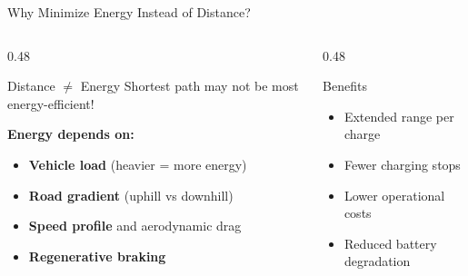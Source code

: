 \documentclass[aspectratio=169,11pt]{beamer}
\newcommand{\highlight}[1]{\textcolor{accentgreen}{\textbf{#1}}}
\begin{document}
\begin{frame}{Why Minimize Energy Instead of Distance?}
    \begin{columns}[T]
        \begin{column}{0.48\textwidth}
            \begin{alertblock}{Distance $\neq$ Energy}
                Shortest path may not be most energy-efficient!
            \end{alertblock}

            \textbf{Energy depends on:}
            \begin{itemize}
                \item \highlight{Vehicle load} (heavier = more energy)
                \item \highlight{Road gradient} (uphill vs downhill)
                \item \highlight{Speed profile} and aerodynamic drag
                \item \highlight{Regenerative braking}
            \end{itemize}
        \end{column}
        \begin{column}{0.48\textwidth}
            \begin{exampleblock}{Benefits}
                \begin{itemize}
                    \item Extended range per charge
                    \item Fewer charging stops
                    \item Lower operational costs
                    \item Reduced battery degradation
                \end{itemize}
            \end{exampleblock}
        \end{column}
    \end{columns}

    \vspace{0.3cm}
    \begin{center}
    \end{center}
\end{frame}

\end{document}
